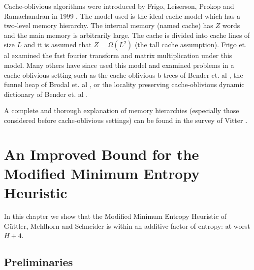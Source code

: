 \documentclass[letterpaper,12pt,titlepage,oneside,final]{book}
\theoremstyle{plain}
\begin{document}
Cache-oblivious algorithms were introduced by Frigo, Leiserson, Prokop and Ramachandran in 1999 \cite{frigo1999cache}. The model used is the ideal-cache model which has a two-level memory hierarchy. The internal memory (named cache) has $Z$ words and the main memory is arbitrarily large. The cache is divided into cache lines of size $L$ and it is assumed that $Z=\Omega(L^2)$ (the tall cache assumption). Frigo et. al examined the fast fourier transform and matrix multiplication under this model. Many others have since used this model and examined problems in a cache-oblivious setting such as the cache-oblivious b-trees of Bender et. al \cite{bender2000cache}, the funnel heap of Brodal et. al \cite{brodai2002funnel}, or the locality preserving cache-oblivious dynamic dictionary of Bender et. al \cite{bender2002locality}.

A complete and thorough explanation of memory hierarchies (especially those considered before cache-oblivious settings) can be found in the survey of Vitter \cite{vitter2001external}.



\chapter{An Improved Bound for the Modified Minimum Entropy Heuristic}\label{An Improved Bound for the Modified Minimum Entropy Heuristic}

In this chapter we show that the Modified Minimum Entropy Heuristic of G{\"u}ttler, Mehlhorn and Schneider \cite{guttler1980binary} is within an additive factor of entropy: at worst $H+4$.

\section{Preliminaries}
\end{document}
